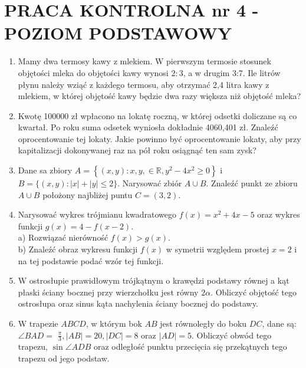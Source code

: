 \documentclass[10pt]{article}
\begin{document}
\section*{PRACA KONTROLNA nr 4 - POZIOM PODSTAWOWY}
\begin{enumerate}
  \item Mamy dwa termosy kawy z mlekiem. W pierwszym termosie stosunek objętości mleka do objętości kawy wynosi $2: 3$, a w drugim 3:7. Ile litrów płynu należy wziąć z każdego termosu, aby otrzymać 2,4 litra kawy z mlekiem, w której objętość kawy będzie dwa razy większa niż objętość mleka?
  \item Kwotę 100000 zł wpłacono na lokatę roczną, w której odsetki doliczane są co kwartał. Po roku suma odsetek wyniosła dokładnie 4060,401 zł. Znaleźć oprocentowanie tej lokaty. Jakie powinno być oprocentowanie lokaty, aby przy kapitalizacji dokonywanej raz na pół roku osiągnąć ten sam zysk?
  \item Dane sa zbiory $A=\left\{(x, y): x, y, \in \mathbb{R}, y^{2}-4 x^{2} \geqslant 0\right\}$ i $B=\{(x, y):|x|+|y| \leqslant 2\}$. Narysować zbiór $A \cup B$. Znaleźć punkt ze zbioru $A \cup B$ położony najbliżej puntu $C=(3,2)$.
  \item Narysować wykres trójmianu kwadratowego $f(x)=x^{2}+4 x-5$ oraz wykres funkcji $g(x)=4-f(x-2)$.\\
a) Rozwiązać nierówność $f(x)>g(x)$.\\
b) Znaleźć obraz wykresu funkcji $f(x)$ w symetrii względem prostej $x=2$ i na tej podstawie podać wzór tej funkcji.
  \item W ostrosłupie prawidłowym trójkątnym o krawędzi podstawy równej a kąt płaski ściany bocznej przy wierzchołku jest równy $2 \alpha$. Obliczyć objętość tego ostrosłupa oraz sinus kąta nachylenia ściany bocznej do podstawy.
  \item W trapezie $A B C D$, w którym bok $A B$ jest równoległy do boku $D C$, dane są: $\angle B A D=$ $\frac{\pi}{3},|A B|=20,|D C|=8$ oraz $|A D|=5$. Obliczyć obwód tego trapezu, $\sin \angle A D B$ oraz odległość punktu przecięcia się przekątnych tego trapezu od jego podstaw.
\end{enumerate}
\end{document}

